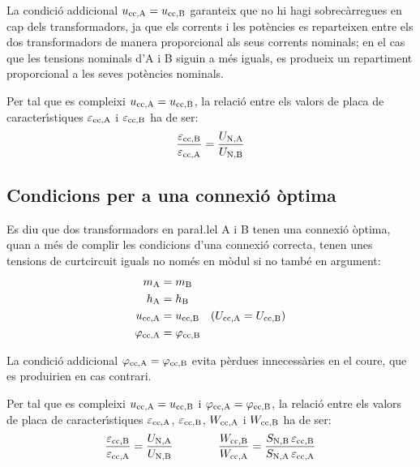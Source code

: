 La condici\'{o} addicional  $u_\mathrm{cc,A} = u_\mathrm{cc,B}$ garanteix que no hi hagi sobrec\`{a}rregues en cap dels transformadors, ja que els corrents i les pot\`{e}ncies es reparteixen entre els dos transformadors de manera proporcional als seus corrents nominals; en el cas que les tensions nominals d'A i B siguin a m\'{e}s iguals, es produeix un repartiment proporcional a les seves pot\`{e}ncies nominals.

Per tal que es compleixi $u_\mathrm{cc,A} = u_\mathrm{cc,B}$, la relaci\'{o} entre els valors de placa de caracter\'{\i}stiques $\varepsilon_\mathrm{cc,A}$ i $\varepsilon_\mathrm{cc,B}$ ha de ser:
\begin{equation}
    \frac{\varepsilon_\mathrm{cc,B}}{\varepsilon_\mathrm{cc,A}} = \frac{U_\mathrm{N,A}}{U_\mathrm{N,B}}
\end{equation}

\subsection{Condicions per a una connexi\'{o} \`{o}ptima}

 Es diu que dos transformadors en para{\l.l}el A i B tenen una connexi\'{o} \`{o}ptima, quan a m\'{e}s de complir les condicions d'una connexi\'{o} correcta, tenen unes tensions de curtcircuit iguals no nom\'{e}s en m\`{o}dul si no tamb\'{e} en argument:
\begin{align}
    m_\mathrm{A} &= m_\mathrm{B}\\
    h_\mathrm{A} &= h_\mathrm{B}\\
    u_\mathrm{cc,A} &= u_\mathrm{cc,B} \quad (U_\mathrm{cc,A} = U_\mathrm{cc,B})\\
    \varphi_\mathrm{cc,A} &=\varphi_\mathrm{cc,B}
\end{align}

La condici\'{o} addicional $\varphi_\mathrm{cc,A} =\varphi_\mathrm{cc,B}$ evita p\`{e}rdues innecess\`{a}ries en el coure, que es produirien en cas contrari.

Per tal que es compleixi $u_\mathrm{cc,A} = u_\mathrm{cc,B} $ i $\varphi_\mathrm{cc,A} =\varphi_\mathrm{cc,B}$, la relaci\'{o} entre els valors de placa de caracter\'{\i}stiques $\varepsilon_\mathrm{cc,A}$, $\varepsilon_\mathrm{cc,B}$, $W_\mathrm{cc,A}$ i $W_\mathrm{cc,B}$ ha de ser:
\begin{equation}
    \frac{\varepsilon_\mathrm{cc,B}}{\varepsilon_\mathrm{cc,A}} = \frac{U_\mathrm{N,A}}{U_\mathrm{N,B}} \qquad\qquad
    \frac{W_\mathrm{cc,B}}{W_\mathrm{cc,A}} = \frac{S_\mathrm{N,B} \,\varepsilon_\mathrm{cc,B}}{S_\mathrm{N,A}\, \varepsilon_\mathrm{cc,A}}
\end{equation}

